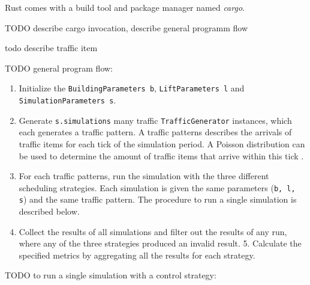 Rust comes with a build tool and package manager named \emph{cargo}. 

TODO describe cargo invocation, describe general programm flow

todo describe traffic item

TODO
general program flow:


\begin{enumerate}
    \item Initialize the \texttt{BuildingParameters b}, \texttt{LiftParameters l} and\\ \texttt{SimulationParameters s}.
    \item Generate \texttt{s.simulations} many traffic \texttt{TrafficGenerator} instances, which each generates a traffic pattern. A traffic patterns describes the arrivals of traffic items for each tick of the simulation period. A Poisson distribution can be used to determine the amount of traffic items that arrive within this tick \autocite{beers2015arrivals}.
    \item For each traffic patterns, run the simulation with the three different scheduling strategies. Each simulation is given the same parameters (\texttt{b, l, s}) and the same traffic pattern. The procedure to run a single simulation is described below.
    \item Collect the results of all simulations and filter out the results of any run, where any of the three strategies produced an invalid result.
    5. Calculate the specified metrics by aggregating all the results for each strategy.
\end{enumerate}

TODO
to run a single simulation with a control strategy:

